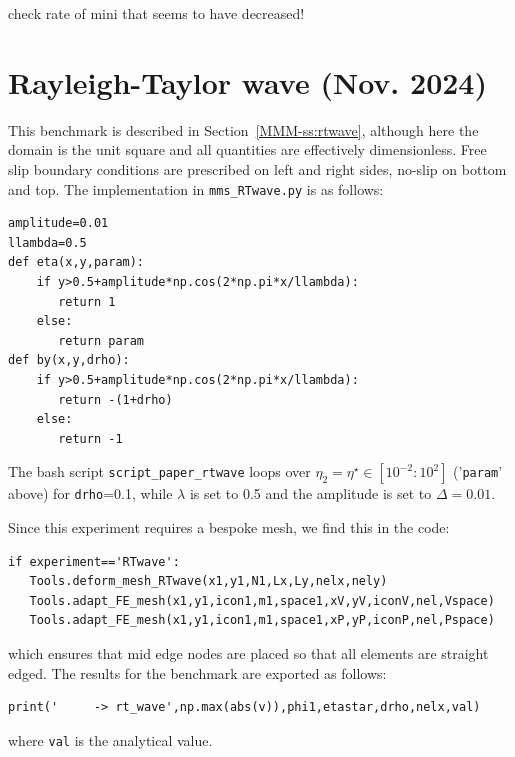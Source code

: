 check rate of mini that seems to have decreased!

\newpage
\section*{Rayleigh-Taylor wave (Nov. 2024)}

This benchmark is described in Section~\ref{MMM-ss:rtwave},
although here the domain is the unit square and all quantities are 
effectively dimensionless.
Free slip boundary conditions are prescribed on left and right sides,
no-slip on bottom and top. 
The implementation in {\tt mms\_RTwave.py} is as follows: 
\begin{lstlisting}
amplitude=0.01
llambda=0.5
def eta(x,y,param):
    if y>0.5+amplitude*np.cos(2*np.pi*x/llambda):
       return 1
    else:
       return param
def by(x,y,drho):
    if y>0.5+amplitude*np.cos(2*np.pi*x/llambda):
       return -(1+drho)
    else:
       return -1
\end{lstlisting}

The bash script {\tt script\_paper\_rtwave} loops over $\eta_2=\eta^\star\in[10^{-2}:10^2]$ ('\lstinline{param}' above) 
for \lstinline{drho}=0.1,
while $\lambda$ is set to 0.5 and the amplitude is set to $\Delta=0.01$.

Since this experiment requires a bespoke mesh, we find this in the code:
\begin{lstlisting}
if experiment=='RTwave':
   Tools.deform_mesh_RTwave(x1,y1,N1,Lx,Ly,nelx,nely)
   Tools.adapt_FE_mesh(x1,y1,icon1,m1,space1,xV,yV,iconV,nel,Vspace)
   Tools.adapt_FE_mesh(x1,y1,icon1,m1,space1,xP,yP,iconP,nel,Pspace)
\end{lstlisting}
which ensures that mid edge nodes are placed so that all elements are straight edged.
The results for the benchmark are exported as follows:
\begin{lstlisting}
print('     -> rt_wave',np.max(abs(v)),phi1,etastar,drho,nelx,val)
\end{lstlisting}
where \lstinline{val} is the analytical value.

